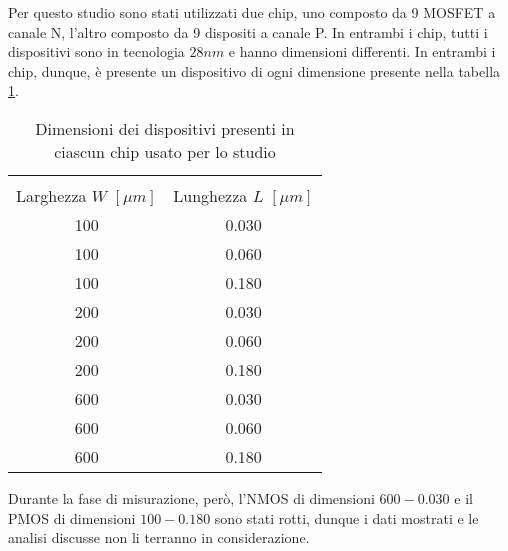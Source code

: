 Per questo studio sono stati utilizzati due chip, uno composto da 9 MOSFET a canale N, l'altro composto da 9 dispositi a canale P. In entrambi i chip, tutti i dispositivi sono in tecnologia $28 nm$ e hanno dimensioni differenti. In entrambi i chip, dunque, è presente un dispositivo di ogni dimensione presente nella tabella \ref{tab:dimensioniMOSFET}.

\begin{table}[H]
  \renewcommand{\arraystretch}{1.3}
  \centering
    \begin{tabular}{c c }
      \toprule \\
          Larghezza $W$ $[\mu m]$ & Lunghezza $L$ $[\mu m]$ \\
     \midrule
	   100 & 0.030 \\
	\hline
	   100 & 0.060 \\
	\hline
	   100 & 0.180 \\
	\hline
	   200 & 0.030 \\
 	\hline
	   200 & 0.060 \\
	\hline
	   200 & 0.180 \\
	\hline
 	   600 & 0.030 \\
	\hline
	   600 & 0.060 \\
	\hline
	   600 & 0.180 \\
      \bottomrule
    \end{tabular}
 
  \caption{Dimensioni dei dispositivi presenti in ciascun chip usato per lo studio}
  \label{tab:dimensioniMOSFET}
\end{table}

Durante la fase di misurazione, però, l'NMOS di dimensioni $600-0.030$ e il PMOS di dimensioni $100-0.180$ sono stati rotti, dunque i dati mostrati e le analisi discusse non li terranno in considerazione.

